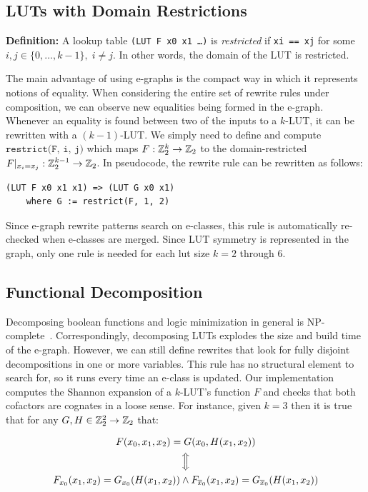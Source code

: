 \subsection{LUTs with Domain Restrictions}\label{sec:rewrites:restrict}

\textbf{Definition:} A lookup table \texttt{(LUT F x0 x1 \ldots)} is \textit{restricted} if \texttt{xi == xj} for some $ i, j \in \{0, \ldots, k-1\}, \; i \neq j$.
In other words, the domain of the LUT is restricted.

The main advantage of using e-graphs is the compact way in which it represents
notions of equality. When considering the entire set of rewrite rules under
composition, we can observe new equalities being formed in the e-graph.
Whenever an equality is found between two of the inputs to a $k$-LUT, it can be
rewritten with a $(k-1)$-LUT. We simply need to define and compute
$\texttt{restrict(F, i, j)}$ which maps $F : \mathbb{Z}_{2}^{k} \rightarrow \mathbb{Z}_{2}$ to the
domain-restricted $F \vert_{x_i = x_j} : \mathbb{Z}_{2}^{k-1} \rightarrow \mathbb{Z}_{2}$. In
pseudocode, the rewrite rule can be rewritten as follows:

\begin{lstlisting}
(LUT F x0 x1 x1) => (LUT G x0 x1)
    where G := restrict(F, 1, 2)
\end{lstlisting}

Since e-graph rewrite patterns search on e-classes, this rule is automatically
re-checked when e-classes are merged. Since LUT symmetry is represented in the
graph, only one rule is needed for each lut size $k=2$ through 6.

\subsection{Functional Decomposition}\label{sec:rewrites:decomp}

Decomposing boolean functions and logic minimization in general is
NP-complete~\cite{logicmin}. Correspondingly, decomposing LUTs explodes the
size and build time of the e-graph. However, we can still define rewrites that
look for fully disjoint decompositions in one or more variables. This rule has
no structural element to search for, so it runs every time an e-class is
updated. Our implementation computes the Shannon expansion of a $k$-LUT's
function $F$ and checks that both cofactors are cognates in a loose sense. For
instance, given $k=3$ then it is true that for any $G, H \in \mathbb{Z}_{2}^2 \rightarrow
    \mathbb{Z}_{2}$ that:

\begin{gather}
    F(x_0, x_1, x_2) = G(x_0, H(x_1, x_2)) \nonumber \\
    \Big\Updownarrow                       \nonumber \\
    F_{x_0} (x_1, x_2) = G_{x_0} (H(x_1, x_2)) \land F_{\overline{x}_0} (x_1, x_2) = G_{\overline{x}_0} (H(x_1, x_2))
\end{gather}

